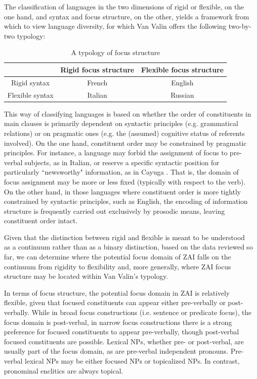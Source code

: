 The classification of languages in the two dimensions of rigid or flexible, on the one hand, and syntax and focus structure, on the other, yields a framework from which to view language diversity, for which Van Valin offers the following two-by-two typology:
\begin{table}[H]
\begin{center}
\caption{\small{A typology of focus structure \citep{vanvalin1999}}}
\begin{tabular}{| c | c | c |}\hline
& Rigid focus structure & Flexible focus structure  \\
\hline
Rigid syntax & French &  English \\
\hline
Flexible syntax & Italian & Russian \\
\hline
\end{tabular}
\end{center}
\end{table}
This way of classifying languages is based on whether the order of constituents in main clauses is primarily dependent on syntactic principles (e.g. grammatical relations) or on pragmatic ones (e.g. the (assumed) cognitive status of referents involved). On the one hand, constituent order may be constrained by pragmatic principles. For instance, a language may forbid the assignment of focus to pre-verbal subjects, as in Italian, or reserve a specific syntactic position for particularly ``newsworthy" information, as in Cayuga \citep{mithun1992}. That is, the domain of focus assignment may be more or less fixed (typically with respect to the verb). On the other hand, in those languages where constituent order is more tightly constrained by syntactic principles, such as English, the encoding of information structure is frequently carried out exclusively by prosodic means, leaving constituent order intact.

Given that the distinction between rigid and flexible is meant to be understood as a continuum rather than as a binary distinction, based on the data reviewed so far, we can determine where the potential focus domain of ZAI falls on the continuum from rigidity to flexibility and, more generally, where ZAI focus structure may be located within Van Valin's typology.

In terms of focus structure, the potential focus domain in ZAI is relatively flexible, given that focused constituents can appear either pre-verbally or post-verbally. While in broad focus constructions (i.e. sentence or predicate focus), the focus domain is post-verbal, in narrow focus constructions there is a strong preference for focused constituents to appear pre-verbally, though post-verbal focused constituents are possible. Lexical NPs, whether pre- or post-verbal, are usually part of the focus domain, as are pre-verbal independent pronouns. Pre-verbal lexical NPs may be either focused NPs or topicalized NPs. In contrast, pronominal enclitics are always topical. 

